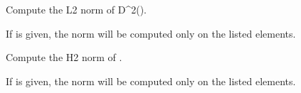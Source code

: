 \documentclass[a4paper,11pt,english]{sphinxmanual}
\begin{document}

\begin{fulllineitems}
\label{\detokenize{python/cmdref_Module compute:getfem.compute_H2_semi_norm}}
Compute the L2 norm of D\textasciicircum{}2().

If  is given, the norm will be computed only on the listed
elements.

\end{fulllineitems}


\begin{fulllineitems}
\label{\detokenize{python/cmdref_Module compute:getfem.compute_H2_norm}}
Compute the H2 norm of .

If  is given, the norm will be computed only on the listed
elements.

\end{fulllineitems}

\end{document}
